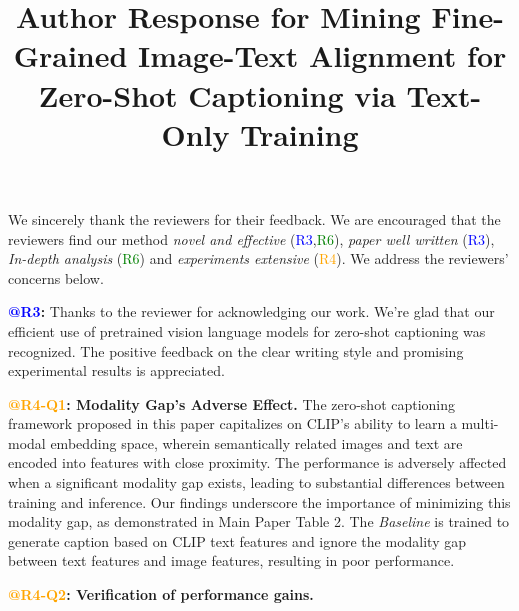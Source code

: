 \documentclass[letterpaper]{article} %
\title{Author Response for Mining Fine-Grained Image-Text Alignment for Zero-Shot Captioning via Text-Only Training}
\begin{document}



\noindent We sincerely thank the reviewers for their feedback. We are encouraged that the reviewers find our method \textit{novel and effective} (\textcolor{Blue}{R3},\textcolor{Green}{R6}), \textit{paper well written} (\textcolor{Blue}{R3}), \textit{In-depth analysis} (\textcolor{Green}{R6}) and \textit{experiments extensive} (\textcolor{Orange}{R4}). We address the reviewers' concerns below.


\noindent \textbf{\textcolor{blue}{@R3}:}  Thanks to the reviewer for acknowledging our work. We're glad that our efficient use of pretrained vision language models for zero-shot captioning was recognized. The positive feedback on the clear writing style and promising experimental results is appreciated.

\noindent \textbf{\textcolor{Orange}{@R4-Q1}: Modality Gap's Adverse Effect.}
The zero-shot captioning framework proposed in this paper capitalizes on CLIP's ability to learn a multi-modal embedding space, wherein semantically related images and text are encoded into features with close proximity. The performance is adversely affected when a significant modality gap exists, leading to substantial differences between training and inference. Our findings underscore the importance of minimizing this modality gap, as demonstrated in Main Paper Table 2. The \textit{Baseline} is trained to generate caption based on CLIP text features and ignore the modality gap between text features and image features, resulting in poor performance.

\noindent \textbf{\textcolor{Orange}{@R4-Q2}: Verification of performance gains.}
\end{document}
